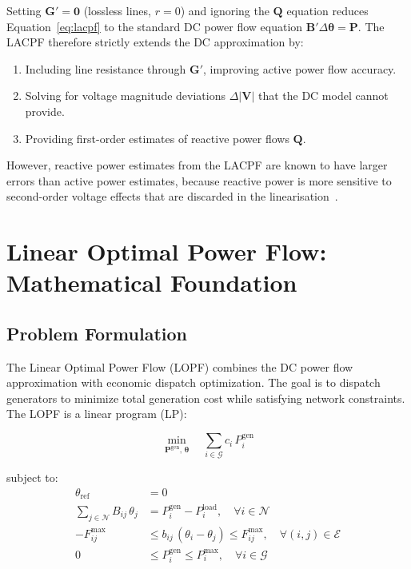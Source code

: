 Setting $\mathbf{G}' = \mathbf{0}$ (lossless lines, $r = 0$) and ignoring the $\mathbf{Q}$ equation reduces Equation~\eqref{eq:lacpf} to the standard DC power flow equation $\mathbf{B}'\Delta\boldsymbol{\theta} = \mathbf{P}$. The LACPF therefore strictly extends the DC approximation by:
\begin{enumerate}
    \item Including line resistance through $\mathbf{G}'$, improving active power flow accuracy.
    \item Solving for voltage magnitude deviations $\Delta|\mathbf{V}|$ that the DC model cannot provide.
    \item Providing first-order estimates of reactive power flows $\mathbf{Q}$.
\end{enumerate}
However, reactive power estimates from the LACPF are known to have larger errors than active power estimates, because reactive power is more sensitive to second-order voltage effects that are discarded in the linearisation~\cite{stott1974dc}.

\section{Linear Optimal Power Flow: Mathematical Foundation}

\subsection{Problem Formulation}

The Linear Optimal Power Flow (LOPF) combines the DC power flow approximation with economic dispatch optimization. The goal is to dispatch generators to minimize total generation cost while satisfying network constraints. The LOPF is a linear program (LP):

\begin{equation}
    \min_{\mathbf{P}^\text{gen},\, \boldsymbol{\theta}} \quad \sum_{i \in \mathcal{G}} c_i\,P_i^\text{gen}
    \label{eq:lopf_obj}
\end{equation}

subject to:
\begin{align}
    \theta_{\text{ref}} &= 0 \label{eq:lopf_ref} \\[4pt]
    \sum_{j \in \mathcal{N}} B_{ij}\,\theta_j &= P_i^\text{gen} - P_i^\text{load}, \quad \forall i \in \mathcal{N} \label{eq:lopf_balance}\\[4pt]
    -F_{ij}^\text{max} &\leq b_{ij}\,(\theta_i - \theta_j) \leq F_{ij}^\text{max}, \quad \forall (i,j) \in \mathcal{E} \label{eq:lopf_flow}\\[4pt]
    0 &\leq P_i^\text{gen} \leq P_i^\text{max}, \quad \forall i \in \mathcal{G} \label{eq:lopf_gen}
\end{align}

